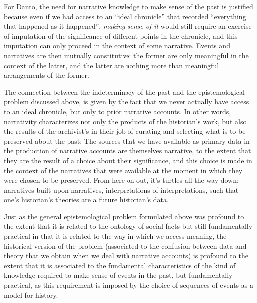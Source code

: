For Danto, the need for narrative knowledge to make sense of the past is justified because even if we had access to an ``ideal chronicle'' that recorded ``everything that happened as it happened'', \emph{making sense of it} would still require an exercise of imputation of the significance of different points in the chronicle, and this imputation can only proceed in the context of some narrative.
Events and narratives are then mutually constitutive: the former are only meaningful in the context of the latter, and the latter are nothing more than meaningful arrangements of the former.

The connection between the indeterminacy of the past and the epistemological problem discussed above, is given by the fact that we never actually have access to an ideal chronicle, but only to prior narrative accounts.
In other words, narrativity characterizes not only the products of the historian's work, but also the results of the archivist's in their job of curating and selecting what is to be preserved about the past:
The sources that we have available as primary data in the production of narrative accounts are themselves narrative, to the extent that they are the result of a choice about their significance, and this choice is made in the context of the narratives that were available at the moment in which they were chosen to be preserved.
From here on out, it's turtles all the way down: narratives built upon narratives, interpretations of interpretations, such that one's historian's theories are a future historian's data.

Just as the general epistemological problem formulated above was profound to the extent that it is related to the ontology of social facts but still fundamentally practical in that it is related to the way in which we access meaning, the historical version of the problem (associated to the confusion between data and theory that we obtain when we deal with narrative accounts) is profound to the extent that it is associated to the fundamental characteristics of the kind of knowledge required to make sense of events in the past, but fundamentally practical, as this requirement is imposed by the choice of sequences of events as a model for history.

